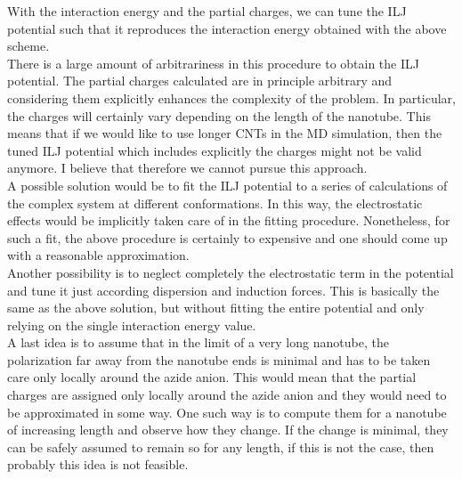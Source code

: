 \documentclass[utf8]{article}
\begin{document}
%
\medskip
With the interaction energy and the partial charges, we can tune the ILJ potential such that it reproduces the interaction energy obtained with the above scheme.\\
\newline
There is a large amount of arbitrariness in this procedure to obtain the ILJ potential.
The partial charges calculated are in principle arbitrary and considering them explicitly enhances the complexity of the problem. In particular, the charges will certainly vary depending on the length of the nanotube. This means that if we would like to use longer CNTs in the MD simulation, then the tuned ILJ potential which includes explicitly the charges might not be valid anymore.
I believe that therefore we cannot pursue this approach.\\
A possible solution would be to fit the ILJ potential to a series of calculations of the complex system at different conformations. In this way, the electrostatic effects would be implicitly taken care of in the fitting procedure. Nonetheless, for such a fit, the above procedure is certainly to expensive and one should come up with a reasonable approximation.\\
Another possibility is to neglect completely the electrostatic term in the potential and tune it just according dispersion and induction forces. This is basically the same as the above solution, but without fitting the entire potential and only relying on the single interaction energy value.\\
A last idea is to assume that in the limit of a very long nanotube, the polarization far away from the nanotube ends is minimal and has to be taken care only locally around the azide anion. This would mean that the partial charges are assigned only locally around the azide anion and they would need to be approximated in some way. One such way is to compute them for a nanotube of increasing length and observe how they change. If the change is minimal, they can be safely assumed to remain so for any length, if this is not the case, then probably this idea is not feasible.






\clearpage
\end{document}
